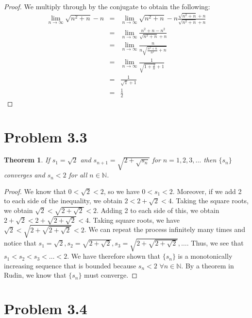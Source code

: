 \documentclass[psamsfonts]{amsart}
\newtheorem{thm}{Theorem}[section]
\theoremstyle{definition}
\theoremstyle{remark}
\numberwithin{equation}{section}
\begin{document}
\begin{proof}
We multiply through by the conjugate to obtain the following:
\begin{eqnarray}
\lim_{ n \to \infty} \sqrt{n^2 + n} - n &=& \lim_{ n \to \infty} \sqrt{n^2 + n} - n \frac{\sqrt{n^2 + n} + n}{\sqrt{n^2 + n} + n} \\
&=& \lim_{n \to \infty} \frac{n^2 + n - n^2}{\sqrt{n^2 + n} + n} \nonumber \\
&=& \lim_{n \to \infty} \frac{n}{ n \sqrt{\frac{n^2 + n}{n^2} + n}} \nonumber \\
&=& \lim_{n \to \infty} \frac{1}{ \sqrt{1 + \frac{1}{n}} + 1} \nonumber \\
&=& \frac{1}{\sqrt{1} + 1} \nonumber \\
&=& \frac{1}{2} \nonumber
\end{eqnarray}
\end{proof}

\section{Problem 3.3}

\begin{thm}
If $s_1 = \sqrt{2}$ and $s_{n+1} = \sqrt{2 + \sqrt{s_n}}$ for $ n = 1,2,3, \ldots$ then $\{ s_n \}$ converges and $s_n < 2$ for all $n \in \mathbb{N}$. 
\end{thm}

\begin{proof}
We know that $0 < \sqrt{2} < 2$, so we have $0 < s_1 < 2$. Moreover, if we add 2 to each side of the inequality, we obtain $2 < 2 + \sqrt{2} < 4$. Taking the square roots, we obtain $\sqrt{2} < \sqrt{2 + \sqrt{2}} < 2$. Adding 2 to each side of this, we obtain $2 + \sqrt{2} < 2 + \sqrt{2 + \sqrt{2}} < 4$. Taking square roots, we have $\sqrt{2} < \sqrt{ 2 + \sqrt{2 + \sqrt{2}}} < 2$. We can repeat the process infinitely many times and notice that $s_1 = \sqrt{2}, s_2 = \sqrt{2 + \sqrt{2}}, s_3 = \sqrt{2 + \sqrt{2 + \sqrt{2}}}, \ldots$. Thus, we see that $s_1 < s_2 < s_3 < \ldots < 2$. We have therefore shown that $\{ s_n \}$ is a monotonically increasing sequence that is bounded because $s_n < 2$ $ \forall n \in \mathbb{N}$. By a theorem in Rudin, we know that $\{ s_n \}$ must converge.
\end{proof}

\section{Problem 3.4}
\end{document}
